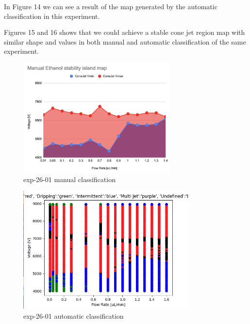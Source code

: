     In Figure 14 we can see a result of the map generated by the automatic classification in this experiment.

    Figures 15 and 16 shows that we could achieve a stable cone jet region map with similar shape and values in both manual and automatic classification of the same experiment.

    \begin{multicols}{2}


        \begin{figure}[H]
            \center
            \includegraphics[width=8cm]{Figuras/april/manual_stability.png}
            \caption{ exp-26-01 manual classification}
        \end{figure}

        \begin{figure}[H]
            \center
            \includegraphics[width=9cm]{Figuras/report3/map-exp-26-01.png}
            \caption{ exp-26-01 automatic classification}
        \end{figure}

    \end{multicols}

